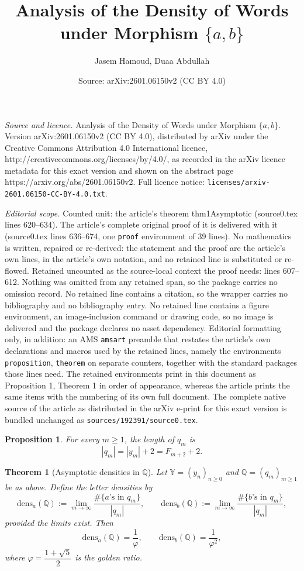 \documentclass[10pt,a4paper]{amsart}
\title{Analysis of the Density of Words under Morphism $\{a,b\}$}
\author{Jasem Hamoud, Duaa Abdullah}
\date{Source: arXiv:2601.06150v2 (CC BY 4.0)}
\newtheorem{proposition}{Proposition}
\newtheorem{theorem}{Theorem}
\newcommand{\dens}{\mathrm{dens}}
\begin{document}
\maketitle

\noindent\emph{Source and licence.} Analysis of the Density of Words under Morphism $\{a,b\}$. Version arXiv:2601.06150v2 (CC BY 4.0), distributed by arXiv under the Creative Commons Attribution 4.0 International licence, http://creativecommons.org/licenses/by/4.0/, as recorded in the arXiv licence metadata for this exact version and shown on the abstract page https://arxiv.org/abs/2601.06150v2. Full licence notice: \texttt{licenses/arxiv-2601.06150-CC-BY-4.0.txt}.\par\smallskip

\noindent\textit{Editorial scope.} Counted unit: the article's theorem thm1Asymptotic (source0.tex lines 620--634). The article's complete original proof of it is delivered with it (source0.tex lines 636--674, one \texttt{proof} environment of 39 lines). No mathematics is written, repaired or re-derived: the statement and the proof are the article's own lines, in the article's own notation, and no retained line is substituted or re-flowed.  Retained uncounted as the source-local context the proof needs: lines 607--612.  Nothing was omitted from any retained span, so the package carries no omission record.  No retained line contains a citation, so the wrapper carries no bibliography and no bibliography entry.  No retained line contains a figure environment, an image-inclusion command or drawing code, so no image is delivered and the package declares no asset dependency.  Editorial formatting only, in addition: an AMS \texttt{amsart} preamble that restates the article's own declarations and macros used by the retained lines, namely the environments \texttt{proposition}, \texttt{theorem} on separate counters, together with the standard packages those lines need.  The retained environments print in this document as Proposition 1, Theorem 1 in order of appearance, whereas the article prints the same items with the numbering of its own full document.  The complete native source of the article as distributed in the arXiv e-print for this exact version is bundled unchanged as \texttt{sources/192391/source0.tex}.
\begin{proposition}\label{pro1defnewwordn2}
For every $m \ge 1$, the length of $q_m$ is
\[
|q_m| = |y_m| + 2 = F_{m+2} + 2.
\]
\end{proposition}

\begin{theorem}[Asymptotic densities in $\mathbb{Q}$]\label{thm1Asymptotic}
Let $\mathbb{Y} = (y_n)_{n \ge 0}$ and $\mathbb{Q} = (q_m)_{m \ge 1}$ be as above. Define the letter densities by
\[
\dens_a(\mathbb{Q}) := \lim_{m \to \infty} \frac{\#\{\text{$a$'s in } q_m\}}{|q_m|}, 
\qquad
\dens_b(\mathbb{Q}) := \lim_{m \to \infty} \frac{\#\{\text{$b$'s in } q_m\}}{|q_m|},
\]
provided the limits exist. Then
\[
\dens_a(\mathbb{Q}) = \frac{1}{\varphi},
\qquad
\dens_b(\mathbb{Q}) = \frac{1}{\varphi^2},
\]
where $\varphi = \dfrac{1+\sqrt{5}}{2}$ is the golden ratio.
\end{theorem}
\end{document}
